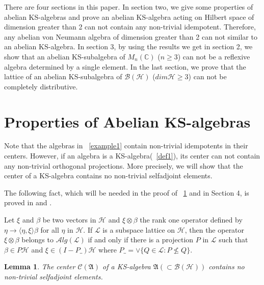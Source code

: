 \documentclass[a4paper,10pt]{amsart}
\newtheorem{lemma}{Lemma}[section]
\theoremstyle{refs}
\newcommand{\AAA}{\mathfrak A}
\newcommand{\BBB}{\mathcal B}
\newcommand{\CCC}{\mathcal C}
\newcommand{\HHH}{\mathcal H} %
\newcommand{\LLL}{\mathcal L} %
\newcommand{\Alg}{\mathcal Alg}
\newcommand{\C}{\mathbb C} %
\begin{document}
There are four sections in this paper. In section two, we give some properties
of abelian KS-algebras and prove an abelian KS-algebra acting on
Hilbert space of dimension greater than 2 can not contain any
non-trivial idempotent. Therefore, any abelian von
Neumann algebra of dimension greater than 2 can not similar to an
abelian
KS-algebra. In section 3, by using the results we get in section 2, we show
that an abelian KS-subalgebra of $M_n(\C)$ ($n \geq 3$) can not be a reflexive
algebra determined by a single element. In the last section, we
prove that the
lattice of an abelian KS-subalgebra of $\BBB(\HHH)$ ($dim\HHH \geq 3$) can not
be completely distributive.

\section{Properties of Abelian KS-algebras}

Note that the algebras in ~\cref{example1} contain non-trivial
idempotents in their centers. However, if an algebra is a
KS-algebra(~\cref{def1}), its center can not contain any non-trivial orthogonal
projections.
More precisely, we will show that the center of a KS-algebra contains
no non-trivial selfadjoint elements.

The following fact, which will be needed in the proof of ~\cref{lma1} and 
in Section 4, is proved in \cite{R1} and \cite{L}. 

Let $\xi$ and $\beta$ be two vectors in $\HHH$ and $\xi \otimes \beta$ the
rank one operator defined by $\eta \rightarrow \langle\eta, \xi\rangle\beta$
for all $\eta$ in $\HHH$. If $\LLL$ is a subspace lattice on $\HHH$,
then the operator $\xi \otimes \beta$ belongs
to $\Alg(\LLL)$ if
and only if there is a projection $P$ in $\LLL$ such that $\beta \in P\HHH$
and $\xi \in (I-P\_)\HHH$ where $P\_ = \vee \{ Q \in \LLL : P \nleq Q \}$.

\begin{lemma}\label{lma1}
The center $\CCC(\AAA)$ of a KS-algebra $\AAA ( \subset \BBB(\HHH))$
contains no non-trivial selfadjoint elements.
\end{lemma}
\end{document}
